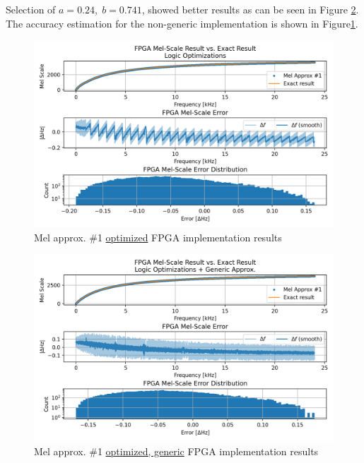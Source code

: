 Selection of \(a=0.24,\;b=0.741\), showed better results
as can be seen in Figure \ref{fig:mel_approx_logic_opt_generic}.
The accuracy estimation for the non-generic implementation
is shown in Figure\;\ref{fig:mel_approx_logic_opt}.

\begin{figure}[H]
    \centering
    \includegraphics[width=\linewidth]{Scaling/images/mel_approx_logic_opt}
    \caption{Mel approx. \#1 \underline{optimized} FPGA implementation results}\label{fig:mel_approx_logic_opt}
\end{figure}


\begin{figure}[H]
    \centering
    \includegraphics[width=\linewidth]{Scaling/images/mel_approx_logic_opt_generic}
    \caption{Mel approx. \#1 \underline{optimized, generic} FPGA implementation results}\label{fig:mel_approx_logic_opt_generic}
\end{figure}


